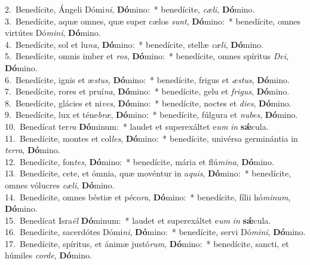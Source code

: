 {2.~}Benedícite, Ángeli Dómi\textit{ni}, \textbf{Dó}mino:~* benedícite, \textit{cæ}\textit{li}, \textbf{Dó}mino.\\
{3.~}Benedícite, aquæ omnes, quæ super cælos \textit{sunt}, \textbf{Dó}mino:~* benedícite, omnes virtútes Dó\textit{mi}\textit{ni}, \textbf{Dó}mino.\\
{4.~}Benedícite, sol et lu\textit{na}, \textbf{Dó}mino:~* benedícite, stellæ \textit{cæ}\textit{li}, \textbf{Dó}mino.\\
{5.~}Benedícite, omnis imber et \textit{ros}, \textbf{Dó}mino:~* benedícite, omnes spíritus \textit{De}\textit{i}, \textbf{Dó}mino.\\
{6.~}Benedícite, ignis et æ\textit{stus}, \textbf{Dó}mino:~* benedícite, frigus et \textit{æ}\textit{stus}, \textbf{Dó}mino.\\
{7.~}Benedícite, rores et pruí\textit{na}, \textbf{Dó}mino:~* benedícite, gelu et \textit{fri}\textit{gus}, \textbf{Dó}mino.\\
{8.~}Benedícite, glácies et ni\textit{ves}, \textbf{Dó}mino:~* benedícite, noctes et \textit{di}\textit{es}, \textbf{Dó}mino.\\
{9.~}Benedícite, lux et téne\textit{bræ}, \textbf{Dó}mino:~* benedícite, fúlgura et \textit{nu}\textit{bes}, \textbf{Dó}mino.\\
{10.~}Benedícat ter\textit{ra} \textbf{Dó}minum:~* laudet et superexáltet e\textit{um} \textit{in} \textbf{sǽ}cula.\\
{11.~}Benedícite, montes et col\textit{les}, \textbf{Dó}mino:~* benedícite, univérsa germinántia in \textit{ter}\textit{ra}, \textbf{Dó}mino.\\
{12.~}Benedícite, fon\textit{tes}, \textbf{Dó}mino:~* benedícite, mária et flú\textit{mi}\textit{na}, \textbf{Dó}mino.\\
{13.~}Benedícite, cete, et ómnia, quæ movéntur in a\textit{quis}, \textbf{Dó}mino:~* benedícite, omnes vólucres \textit{cæ}\textit{li}, \textbf{Dó}mino.\\
{14.~}Benedícite, omnes béstiæ et péco\textit{ra}, \textbf{Dó}mino:~* benedícite, fílii hó\textit{mi}\textit{num}, \textbf{Dó}mino.\\
{15.~}Benedícat Isra\textit{ël} \textbf{Dó}minum:~* laudet et superexáltet e\textit{um} \textit{in} \textbf{sǽ}cula.\\
{16.~}Benedícite, sacerdótes Dómi\textit{ni}, \textbf{Dó}mino:~* benedícite, servi Dó\textit{mi}\textit{ni}, \textbf{Dó}mino.\\
{17.~}Benedícite, spíritus, et ánimæ justó\textit{rum}, \textbf{Dó}mino:~* benedícite, sancti, et húmiles \textit{cor}\textit{de}, \textbf{Dó}mino.\\
